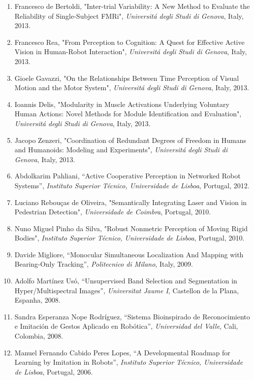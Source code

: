 \documentclass[
]{article}
\begin{document}
\begin{enumerate}
  Fouzhan Housseini, "Low-Power Lightweight Vision Supercomputer:
  Algorithms and Architectures", \emph{Universitá degli Studi di
  Genova}, Italy, 2013.
\item
  Francesco de Bertoldi, "Inter-trial Variability: A New Method to
  Evaluate the Reliability of Single-Subject FMRi", \emph{Universitá
  degli Studi di Genova}, Italy, 2013.
\item
  Francesco Rea, "From Perception to Cognition: A Quest for Effective
  Active Vision in Human-Robot Interaction", \emph{Universitá degli
  Studi di Genova}, Italy, 2013.
\item
  Gioele Gavazzi, "On the Relationships Between Time Perception of
  Visual Motion and the Motor System", \emph{Universitá degli Studi di
  Genova}, Italy, 2013.
\item
  Ioannis Delis, "Modularity in Muscle Activations Underlying Voluntary
  Human Actions: Novel Methods for Module Identification and
  Evaluation", \emph{Universitá degli Studi di Genova}, Italy, 2013.
\item
  Jacopo Zenzeri, "Coordination of Redundant Degrees of Freedom in
  Humans and Humanoids: Modeling and Experiments", \emph{Universitá
  degli Studi di} \emph{Genova}, Italy, 2013.
\item
  Abdolkarim Pahliani, ``Active Cooperative Perception in Networked
  Robot Systems'', \emph{Instituto Superior Técnico, Universidade de
  Lisboa}, Portugal, 2012.
\item
  Luciano Rebouças de Oliveira, "Semantically Integrating Laser and
  Vision in Pedestrian Detection", \emph{Universidade de Coimbra},
  Portugal, 2010.
\item
  Nuno Miguel Pinho da Silva, "Robust Nonmetric Perception of Moving
  Rigid Bodies", \emph{Instituto Superior Técnico, Universidade de
  Lisboa}, Portugal, 2010.
\item
  Davide Migliore, ``Monocular Simultaneous Localization And Mapping
  with Bearing-Only Tracking'', \emph{Politecnico di Milano}, Italy,
  2009.
\item
  Adolfo Martínez Usó, ``Unsupervised Band Selection and Segmentation in
  Hyper/Multispectral Images'', \emph{Universitat Jaume I}, Castellon de
  la Plana, Espanha, 2008.
\item
  Sandra Esperanza Nope Rodríguez, ``Sistema Bioinspirado de
  Reconocimiento e Imitación de Gestos Aplicado en Robótica'',
  \emph{Universidad del Valle}, Cali, Colombia, 2008.~
\item
  Manuel Fernando Cabido Peres Lopes, ``A Developmental Roadmap for
  Learning by Imitation in Robots'', \emph{Instituto Superior Técnico,
  Universidade de Lisboa}, Portugal, 2006.
\end{enumerate}
\end{document}
